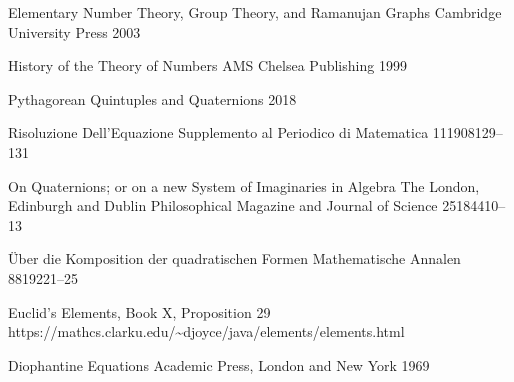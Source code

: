 \documentclass[12pt,table]{article}
\numberwithin{equation}{section}
\begin{document}
\begin{landscape}
{{\begin{thebibliography}{1}




         {Elementary Number Theory,
           Group Theory,
           and Ramanujan Graphs}
         {Cambridge University Press}
         {2003}

         {History of the Theory of Numbers}
         {AMS Chelsea Publishing}
         {1999}

        {Pythagorean Quintuples and Quaternions}
        {2018}



        {Risoluzione Dell'Equazione}
        {Supplemento al Periodico di Matematica}
        {11}{1908}{129--131}


        {On Quaternions; or on a new System of Imaginaries in Algebra}
        {The London, Edinburgh and Dublin Philosophical Magazine
         and Journal of Science}
        {25}{1844}{10--13}


        {\"Uber die Komposition der quadratischen Formen}
        {Mathematische Annalen}
        {88}{1922}{1--25}



        {Euclid's Elements, Book X, Proposition 29}
        {\\https://mathcs.clarku.edu/\~{}djoyce/java/elements/elements.html}

         {Diophantine Equations}
         {Academic Press, London and New York} 
         {1969}




\end{thebibliography}



}%

}%
\end{landscape}
\end{document}
